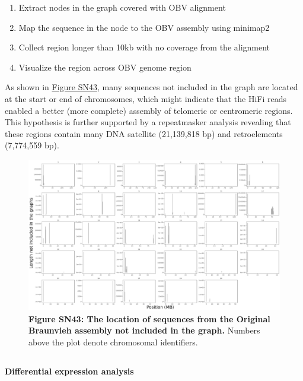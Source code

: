 \documentclass[../main.tex]{subfiles}
\begin{document}
\begin{flushleft}
\bigskip

\begin{enumerate}
    \item Extract nodes in the graph covered with OBV alignment
    \item Map the sequence in the node to the OBV assembly using minimap2
    \item Collect region longer than 10kb with no coverage from the alignment
    \item Visualize the region across OBV genome region
\end{enumerate}

\bigskip

As shown in \hyperlink{Figure SN43}{Figure SN43}, many sequences not included in the graph are located at the start or end of chromosomes, which might indicate that the HiFi reads enabled a better (more complete) assembly of telomeric or centromeric regions. This hypothesis is further supported by a repeatmasker analysis revealing that these regions contain many DNA satellite (21,139,818 bp) and retroelements (7,774,559 bp).

\bigskip
\begin{figure}[!htb]
    \centering
    \includegraphics[width=\textwidth]{paper3/supplement/sp417.png}
    \caption*{\textbf{\hypertarget{Figure SN43}{Figure SN43}: The location of sequences from the Original Braunvieh assembly not included in the graph.} Numbers above the plot denote chromosomal identifiers.}
\end{figure}

\clearpage

\subsection{}
\label{sup_not:s44}
\textbf{Differential expression analysis}
\bigskip


\end{flushleft}
\end{document}
